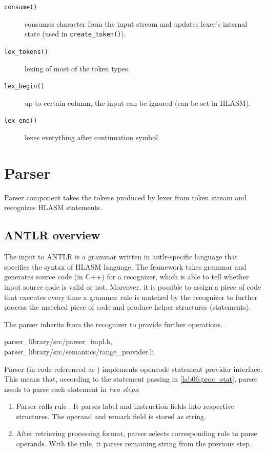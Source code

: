 \begin{description}
\begin{description}
		\item[\texttt{consume()}] consumes character from the input stream and updates lexer's internal state (used in \texttt{create\_token()}).
		
		\item[\texttt{lex\_tokens()}] lexing of most of the token types.
		
		\item[\texttt{lex\_begin()}] up to certain column, the input can be ignored (can be set in HLASM).
		
		\item[\texttt{lex\_end()}] lexes everything after continuation symbol.
		
		
	\end{description}
	
\end{description}


\section{Parser}
\label{lab06:parser}

Parser component takes the tokens produced by lexer from token stream and recognizes HLASM statements.

\subsection{ANTLR overview}

The input to ANTLR is a grammar written in antlr-specific language that specifies the syntax of HLASM language. The framework takes grammar and generates source code (in C++) for a recognizer, which is able to tell whether input source code is valid or not. Moreover, it is possible to assign a piece of code that executes every time a grammar rule is matched by the recognizer to further process the matched piece of code and produce helper structures (statements).

The parser inherits from the recognizer to provide further operations.

{parser\_library/src/parser\_impl.h,
parser\_library/src/semantics/range\_provider.h}

Parser (in code referenced as ) implements opencode statement provider interface. This means that, according to the statement passing in \cref{lab06:proc_stat}, parser needs to parse each statement in \emph{two steps}:

\begin{enumerate}
	\item Parser calls rule . It parses label and instruction fields into respective structures. The operand and remark field is stored as string.
	\item After retrieving processing format, parser selects corresponding rule to parse operands. With the rule, it parses remaining string from the previous step.
\end{enumerate}

